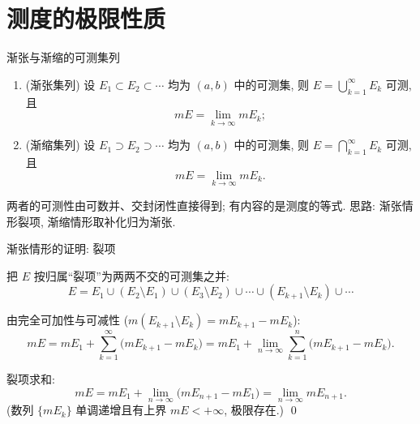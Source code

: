 
\section[极限性质]{测度的极限性质}


\begin{frame}{渐张与渐缩的可测集列}

\begin{thm}[测度的极限性质]
\begin{enumerate}
\item (\alert{渐张}集列) 设 $E_1 \subset E_2 \subset \cdots$ 均为 $(a,b)$ 中的可测集, 则 $E = \bigcup_{k=1}^\infty E_k$ 可测, 且
\[
m E = \lim_{k \to \infty} m E_k ;
\]
\item (\alert{渐缩}集列) 设 $E_1 \supset E_2 \supset \cdots$ 均为 $(a,b)$ 中的可测集, 则 $E = \bigcap_{k=1}^\infty E_k$ 可测, 且
\[
m E = \lim_{k \to \infty} m E_k .
\]
\end{enumerate}
\end{thm}

\pause

\begin{remark}
两者的\alert{可测性}由可数并、交封闭性直接得到; 有内容的是测度的等式. 思路: 渐张情形\alert{裂项}, 渐缩情形\alert{取补化归为渐张}.
\end{remark}

\end{frame}


\begin{frame}{渐张情形的证明: 裂项}

把 $E$ 按归属``裂项''为两两不交的可测集之并:
\[
E = E_1 \cup (E_2 \setminus E_1) \cup (E_3 \setminus E_2) \cup \cdots \cup (E_{k+1} \setminus E_k) \cup \cdots
\]

\pause

由完全可加性与可减性 ($m(E_{k+1} \setminus E_k) = mE_{k+1} - mE_k$):
\[
mE = mE_1 + \sum_{k=1}^\infty \big(m E_{k+1} - m E_k\big)
= mE_1 + \lim_{n \to \infty} \sum_{k=1}^n \big(mE_{k+1} - mE_k\big) .
\]

\pause

裂项求和:
\[
mE = mE_1 + \lim_{n \to \infty} \big(m E_{n+1} - m E_1\big)
= \lim_{n \to \infty} m E_{n+1} .
\]
(数列 $\{mE_k\}$ 单调递增且有上界 $mE < +\infty$, 极限存在.)
\qed

\end{frame}

